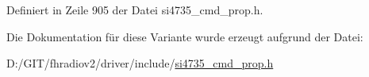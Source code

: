 Definiert in Zeile 905 der Datei si4735\+\_\+cmd\+\_\+prop.\+h.



Die Dokumentation für diese Variante wurde erzeugt aufgrund der Datei\+:\begin{DoxyCompactItemize}
\item 
D\+:/\+G\+I\+T/fhradiov2/driver/include/\hyperlink{si4735__cmd__prop_8h}{si4735\+\_\+cmd\+\_\+prop.\+h}\end{DoxyCompactItemize}
